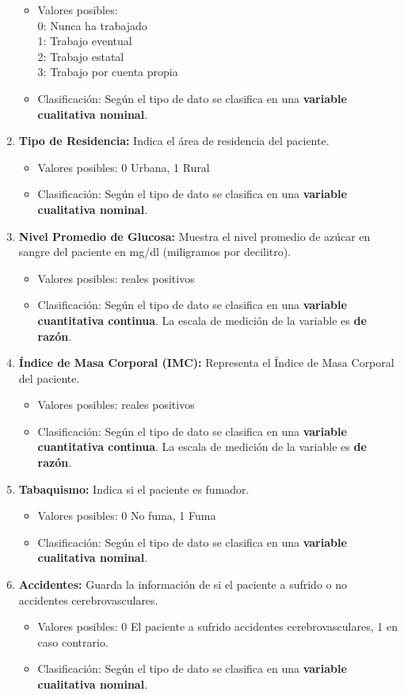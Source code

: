 \documentclass[a4paper, 12pt]{article}
\begin{document}
\begin{enumerate}
    \begin{itemize}
    \item Valores posibles:
    \\
    0: Nunca ha trabajado
    \\
    1: Trabajo eventual
    \\
    2: Trabajo estatal
    \\
    3: Trabajo por cuenta propia
    \item Clasificación: Según el tipo de dato se clasifica en una \textbf{variable cualitativa nominal}.
    \end{itemize}
\item \textbf{Tipo de Residencia:} Indica el área de residencia del paciente.
    \begin{itemize}
    \item Valores posibles: 0 Urbana, 1 Rural
    \item Clasificación: Según el tipo de dato se clasifica en una \textbf{variable cualitativa nominal}.
    \end{itemize}
\item \textbf{Nivel Promedio de Glucosa:} Muestra el nivel promedio de azúcar en sangre del paciente en mg/dl (miligramos por decilitro).
    \begin{itemize}
    \item Valores posibles: reales positivos
    \item Clasificación: Según el tipo de dato se clasifica en una \textbf{variable cuantitativa continua}. La escala de medición de la variable es \textbf{de razón}.
    \end{itemize}
\item \textbf{Índice de Masa Corporal (IMC):} Representa el Índice de Masa Corporal del paciente.
    \begin{itemize}
    \item Valores posibles: reales positivos
    \item Clasificación: Según el tipo de dato se clasifica en una \textbf{variable cuantitativa continua}. La escala de medición de la variable es \textbf{de razón}.
    \end{itemize}
\item \textbf{Tabaquismo:} Indica si el paciente es fumador.
    \begin{itemize}
    \item Valores posibles: 0 No fuma, 1 Fuma
    \item Clasificación: Según el tipo de dato se clasifica en una \textbf{variable cualitativa nominal}.
    \end{itemize}
\item \textbf{Accidentes:} Guarda la información de si el paciente a sufrido o no accidentes cerebrovasculares.   
    \begin{itemize}
    \item Valores posibles: 0 El paciente a sufrido accidentes cerebrovasculares, 1 en caso contrario.
    \item Clasificación: Según el tipo de dato se clasifica en una \textbf{variable cualitativa nominal}.
    \end{itemize}

\end{enumerate}
\end{document}
